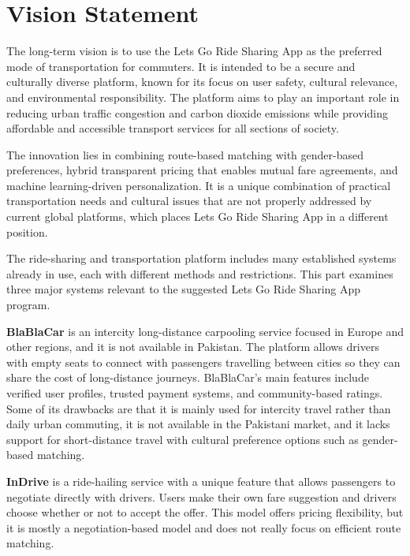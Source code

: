 \section{Vision Statement}

The long-term vision is to use the Lets Go Ride Sharing App as the preferred mode of transportation for commuters. It is intended to be a secure and culturally diverse platform, known for its focus on user safety, cultural relevance, and environmental responsibility. The platform aims to play an important role in reducing urban traffic congestion and carbon dioxide emissions while providing affordable and accessible transport services for all sections of society.

The innovation lies in combining route-based matching with gender-based preferences, hybrid transparent pricing that enables mutual fare agreements, and machine learning-driven personalization. It is a unique combination of practical transportation needs and cultural issues that are not properly addressed by current global platforms, which places Lets Go Ride Sharing App in a different position.

The ride-sharing and transportation platform includes many established systems already in use, each with different methods and restrictions. This part examines three major systems relevant to the suggested Lets Go Ride Sharing App program.

\textbf{BlaBlaCar} is an intercity long-distance carpooling service focused in Europe and other regions, and it is not available in Pakistan. The platform allows drivers with empty seats to connect with passengers travelling between cities so they can share the cost of long-distance journeys. BlaBlaCar's main features include verified user profiles, trusted payment systems, and community-based ratings. Some of its drawbacks are that it is mainly used for intercity travel rather than daily urban commuting, it is not available in the Pakistani market, and it lacks support for short-distance travel with cultural preference options such as gender-based matching.

\textbf{InDrive} is a ride-hailing service with a unique feature that allows passengers to negotiate directly with drivers. Users make their own fare suggestion and drivers choose whether or not to accept the offer. This model offers pricing flexibility, but it is mostly a negotiation-based model and does not really focus on efficient route matching.

